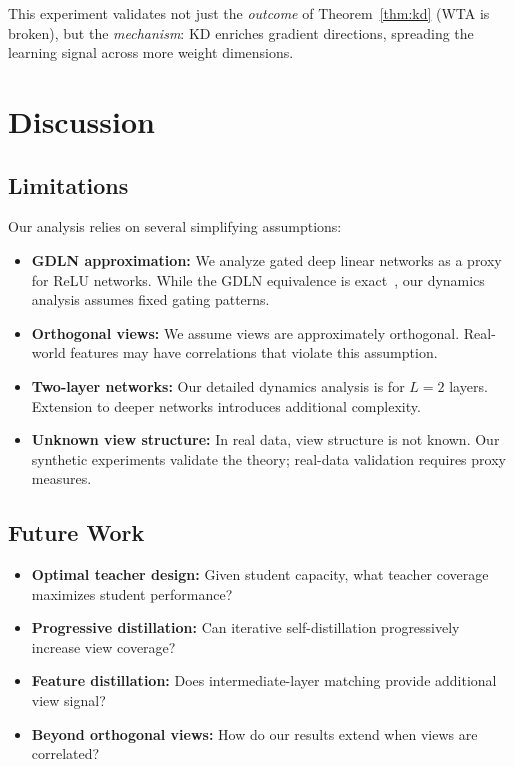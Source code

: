 \documentclass{article}
\begin{document}
This experiment validates not just the \emph{outcome} of Theorem~\ref{thm:kd} (WTA is broken), but the \emph{mechanism}: KD enriches gradient directions, spreading the learning signal across more weight dimensions.

\section{Discussion}
\label{sec:discussion}

\subsection{Limitations}

Our analysis relies on several simplifying assumptions:

\begin{itemize}
    \item \textbf{GDLN approximation:} We analyze gated deep linear networks as a proxy for ReLU networks. While the GDLN equivalence is exact~\cite{jarvis2025relu}, our dynamics analysis assumes fixed gating patterns.

    \item \textbf{Orthogonal views:} We assume views are approximately orthogonal. Real-world features may have correlations that violate this assumption.

    \item \textbf{Two-layer networks:} Our detailed dynamics analysis is for $L=2$ layers. Extension to deeper networks introduces additional complexity.

    \item \textbf{Unknown view structure:} In real data, view structure is not known. Our synthetic experiments validate the theory; real-data validation requires proxy measures.
\end{itemize}

\subsection{Future Work}

\begin{itemize}
    \item \textbf{Optimal teacher design:} Given student capacity, what teacher coverage maximizes student performance?

    \item \textbf{Progressive distillation:} Can iterative self-distillation progressively increase view coverage?

    \item \textbf{Feature distillation:} Does intermediate-layer matching provide additional view signal?

    \item \textbf{Beyond orthogonal views:} How do our results extend when views are correlated?
\end{itemize}
\end{document}

